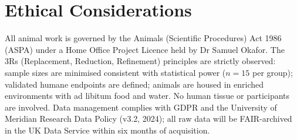 \section{Ethical Considerations}

All animal work is governed by the Animals (Scientific Procedures) Act 1986 (ASPA) under
a Home Office Project Licence held by Dr Samuel Okafor. The 3Rs (Replacement, Reduction,
Refinement) principles are strictly observed: sample sizes are minimised consistent with
statistical power (\(n = 15\) per group); validated humane endpoints are defined; animals
are housed in enriched environments with ad libitum food and water. No human tissue or
participants are involved. Data management complies with GDPR and the University of
Meridian Research Data Policy (v3.2, 2024); all raw data will be FAIR-archived in the
UK Data Service within six months of acquisition.

